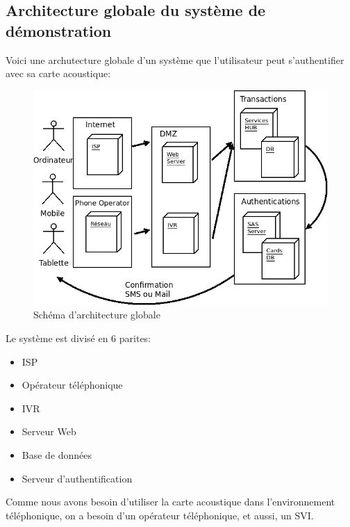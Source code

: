 \subsection{Architecture globale du système de démonstration} 

Voici une archutecture globale d'un système que l'utilisateur peut s'authentifier avec sa carte acoustique:

\begin{figure}[!htbp]
  \centering
    \includegraphics[scale=0.6]{images/arch}
  \caption{Schéma d'architecture globale}
\end{figure}



Le système est divisé en 6 parites:
\begin{itemize}
\item ISP
\item Opérateur téléphonique
\item IVR
\item Serveur Web
\item Base de données 
\item Serveur d'authentification\\
\end{itemize}


Comme nous avons besoin d'utiliser la carte acoustique dans l'environnement téléphonique, on a besoin d'un opérateur téléphonique, et aussi, un SVI.




